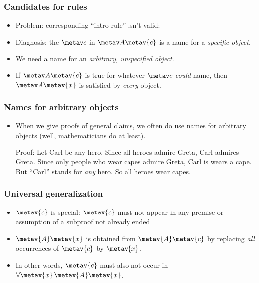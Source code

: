 \begin{frame}
  \frametitle{Candidates for rules}

\begin{itemize}[<+->]
\item Problem: corresponding ``intro rule'' isn't valid:
\begin{fitchproof}
\end{fitchproof}
\item Diagnosis: the $\metav c$ in $\metav A\qv{\metav{c}}$ is a name for
a \emph{specific object}.
\item We need a name for an \emph{arbitrary,
unspecified object}.
\item If $\metav A\qv{\metav{c}}$ is true for whatever $\metav c$
\emph{could} name, then $\metav A\qv{\metav{x}}$ is satisfied by \emph{every} object.
\end{itemize}
\end{frame}

\begin{frame}
\frametitle{Names for arbitrary objects}

\begin{itemize}[<+->]
\item When we give proofs of general claims, we often do use names for
arbitrary objects (well, mathematicians do at least).

\pause
Proof: Let Carl be any hero.  Since all heroes admire Greta, Carl
admires Greta. Since only people who wear capes admire Greta, Carl is
wears a cape. But ``Carl'' stands for \emph{any} hero. So all heroes
wear capes.
\end{itemize}
\end{frame}

\begin{frame}
  \frametitle{Universal generalization}

\begin{fitchproof}
\end{fitchproof}
  \begin{itemize}[<+->]
  \item $\metav{c}$ is special: $\metav{c}$ must not appear in any
  premise or assumption of a subproof not already ended
  \item $\metav{A}\qv{\metav{x}}$ is obtained from $\metav{A}\qv{\metav{c}}$ by replacing \emph{all} occurrences of $\metav{c}$ by $\metav{x}$.
  \item In other words, $\metav{c}$ must also not occur in $\forall
  \metav{x}\,\metav{A}\qv{\metav{x}}$.
 \end{itemize}
\end{frame}

